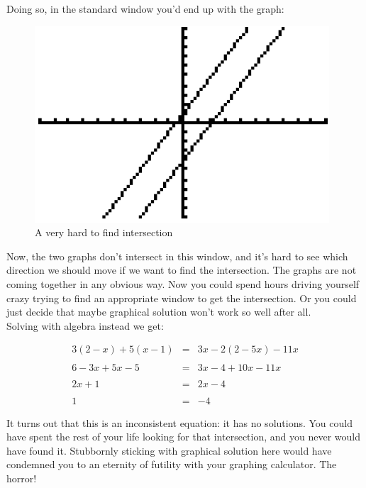 Doing so, in the standard window you’d end up with the graph:\\

\begin{figure}[H]
	\centering
	\includegraphics[scale=1.0]{Sections/SolvingEquationsGraphically/Figure25.png}
	\caption{A very hard to find intersection}
\end{figure}

Now, the two graphs don’t intersect in this window, and it’s hard to see which direction we should move if we want to find the intersection. The graphs are not coming together in any obvious way.  Now you could spend hours driving yourself crazy trying to find an appropriate window to get the intersection. Or you could just decide that maybe graphical solution won’t work so well after all. \\

Solving with algebra instead we get:

\begin{equation*}
	\begin{array}{rcl}
		3(2-x)+5(x-1)& = &3x-2(2-5x)-11x\\
		& &\\
		6-3x+5x-5&=&3x-4+10x-11x\\
		& & \\
		2x+1&=&2x-4\\
		& &\\
		1&=&-4
	\end{array}
\end{equation*}

It turns out that this is an inconsistent equation: it has no solutions. You could have spent the rest of your life looking for that intersection, and you never would have found it. Stubbornly sticking with graphical solution here would have condemned you to an eternity of futility with your graphing calculator. The horror!\\

